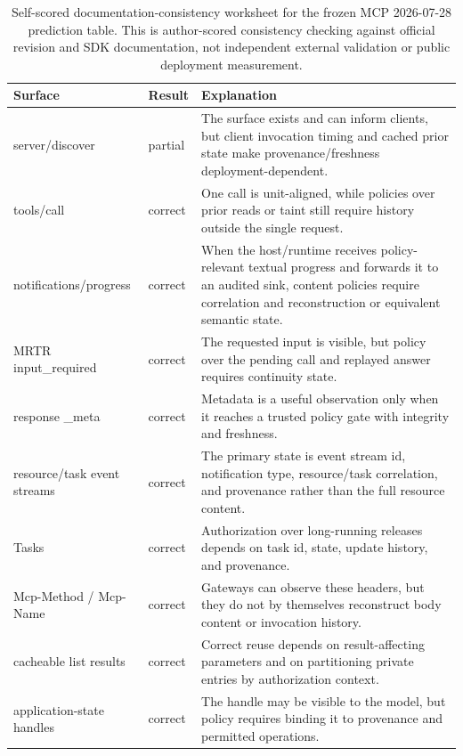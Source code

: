 \begin{table}[t]
  \caption{Self-scored documentation-consistency worksheet for the frozen MCP
  2026-07-28 prediction table. This is author-scored consistency checking
  against official revision and SDK documentation, not independent external
  validation or public deployment measurement.}
  \label{tab:doc-evaluation}
  \centering\footnotesize
  \begin{tabular}{@{}p{}p{}p{}@{}}
    \toprule
    Surface & Result & Explanation \\
    \midrule
    server/discover & partial & The surface exists and can inform clients, but client invocation timing and cached prior state make provenance/freshness deployment-dependent. \\
    tools/call & correct & One call is unit-aligned, while policies over prior reads or taint still require history outside the single request. \\
    notifications/progress & correct & When the host/runtime receives policy-relevant textual progress and forwards it to an audited sink, content policies require correlation and reconstruction or equivalent semantic state. \\
    MRTR input\_required & correct & The requested input is visible, but policy over the pending call and replayed answer requires continuity state. \\
    response \_meta & correct & Metadata is a useful observation only when it reaches a trusted policy gate with integrity and freshness. \\
    resource/task event streams & correct & The primary state is event stream id, notification type, resource/task correlation, and provenance rather than the full resource content. \\
    Tasks & correct & Authorization over long-running releases depends on task id, state, update history, and provenance. \\
    Mcp-Method / Mcp-Name & correct & Gateways can observe these headers, but they do not by themselves reconstruct body content or invocation history. \\
    cacheable list results & correct & Correct reuse depends on result-affecting parameters and on partitioning private entries by authorization context. \\
    application-state handles & correct & The handle may be visible to the model, but policy requires binding it to provenance and permitted operations. \\
    \bottomrule
  \end{tabular}
\end{table}
